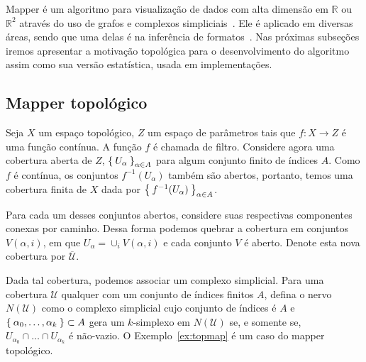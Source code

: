 Mapper é um algoritmo para visualização de dados com alta dimensão em $\mathbb{R}$ ou $\mathbb{R}^2$
através do uso de grafos e complexos simpliciais~\cite{mapper}. Ele é aplicado em diversas áreas,
sendo que uma delas é na inferência de formatos~\cite{Lum2013}. Nas próximas subseções iremos apresentar
a motivação topológica para o desenvolvimento do algoritmo assim como sua versão estatística, usada
em implementações. 

\subsection{Mapper topológico}

Seja $X$ um espaço topológico, $Z$ um espaço de parâmetros tais que $f \colon X \to Z$ é uma
função contínua. A função $f$ é chamada de filtro. Considere agora uma cobertura aberta
de $Z$, $\Set{U_\alpha}_{\alpha \in A}$ para algum conjunto finito de índices $A$. Como
$f$ é contínua, os conjuntos $f^{-1}(U_\alpha)$ também são abertos, portanto, temos uma
cobertura finita de $X$ dada por $\Set{f^{-1}(U_\alpha)}_{\alpha  \in A}$. 

Para cada um desses conjuntos abertos, considere suas respectivas componentes
conexas por caminho. Dessa forma podemos quebrar a cobertura em conjuntos $V(\alpha, i)$, 
em que $U_\alpha = \cup_i V(\alpha,i)$ e cada conjunto $V$ é aberto. Denote esta nova
cobertura por $\overline{\mathcal{U}}$.

Dada tal cobertura, podemos associar um complexo simplicial. Para uma cobertura $\mathcal{U}$
qualquer com um conjunto de índices finitos $A$, defina o nervo $N(\mathcal{U})$ como o 
complexo simplicial cujo conjunto de índices é $A$ e $\Set{\alpha_0, \dots, \alpha_k} \subset A$ 
gera um $k$-simplexo em $N(\mathcal{U})$ se, e somente se, $U_{\alpha_0} \cap \dots \cap U_{\alpha_k}$
é não-vazio. O Exemplo~\ref{ex:topmap} é um caso do mapper topológico.

